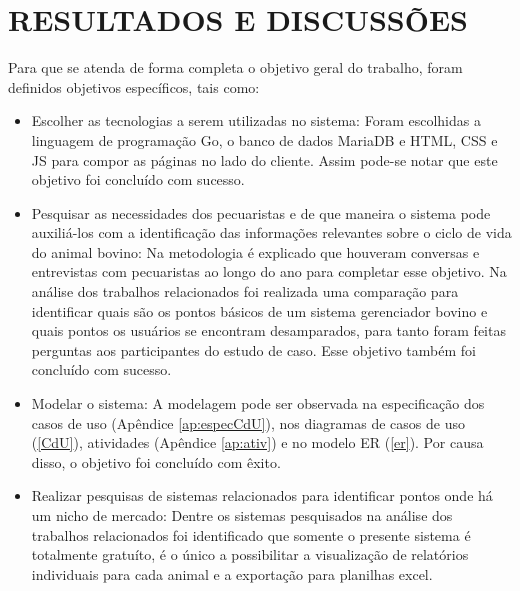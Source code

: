 %
%


\chapter{\textbf{RESULTADOS E DISCUSSÕES}}\label{chap:resultados}

Para que se atenda de forma completa o objetivo geral do trabalho, foram definidos objetivos específicos, tais como:
\begin{itemize}
	\item Escolher as tecnologias a serem utilizadas no sistema:
	\newline
	Foram escolhidas a linguagem de programação Go, o banco de dados MariaDB e HTML, CSS e JS para compor as páginas no lado do cliente. Assim pode-se notar que este objetivo foi concluído com sucesso.

	\item Pesquisar as necessidades dos pecuaristas e de que maneira o sistema pode auxiliá-los com a identificação das informações relevantes sobre o ciclo de vida do animal bovino:
	\newline
	Na metodologia é explicado que houveram conversas e entrevistas com pecuaristas ao longo do ano para completar esse objetivo.	Na análise dos trabalhos relacionados foi realizada uma comparação para identificar quais são os pontos básicos de um sistema gerenciador bovino e quais pontos os usuários se encontram desamparados, para tanto foram feitas perguntas aos participantes do estudo de caso. Esse objetivo também foi concluído com sucesso.

	\item Modelar o sistema:
	\newline
	A modelagem pode ser observada na especificação dos casos de uso (Apêndice \ref{ap:especCdU}),  nos diagramas de casos de uso (\ref{CdU}), atividades (Apêndice \ref{ap:ativ}) e no modelo ER (\ref{er}). Por causa disso, o objetivo foi concluído com êxito.


	\item Realizar pesquisas de sistemas relacionados para identificar pontos onde há um nicho de mercado:
	\newline
	Dentre os sistemas pesquisados na análise dos trabalhos relacionados foi identificado que somente o presente sistema é totalmente gratuíto, é o único a possibilitar a visualização de relatórios individuais para cada animal e a exportação para planilhas excel.


\end{itemize}
